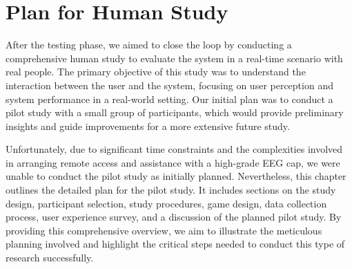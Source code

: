 \chapter{Plan for Human Study}\label{ch:human_study}


After the testing phase, we aimed to close the loop by conducting a comprehensive human study to evaluate the system in a real-time scenario with real people. 
The primary objective of this study was to understand the interaction between the user and the system, focusing on user perception and system performance in a real-world setting. 
Our initial plan was to conduct a pilot study with a small group of participants, which would provide preliminary insights and guide improvements for a more extensive future study.

Unfortunately, due to significant time constraints and the complexities involved in arranging remote access and assistance with a high-grade EEG cap, we were unable to conduct the pilot study as initially planned. 
Nevertheless, this chapter outlines the detailed plan for the pilot study. 
It includes sections on the study design, participant selection, study procedures, game design, data collection process, user experience survey, and a discussion of the planned pilot study. 
By providing this comprehensive overview, we aim to illustrate the meticulous planning involved and highlight the critical steps needed to conduct this type of research successfully.

